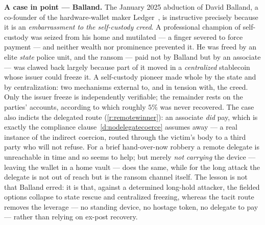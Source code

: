 \medskip\noindent\textbf{A case in point --- Balland.} The January 2025 abduction of
David Balland, a co-founder of the hardware-wallet maker Ledger~\cite{balland}, is
instructive precisely because it is an \emph{embarrassment to the self-custody creed}.
A professional champion of self-custody was seized from his home and mutilated --- a
finger severed to force payment --- and neither wealth nor prominence prevented it. He
was freed by an elite \emph{state} police unit, and the ransom --- paid not by Balland
but by an associate --- was clawed back largely because part of it moved in a
\emph{centralized} stablecoin whose issuer could freeze it. A self-custody pioneer
made whole by the state and by centralization: two mechanisms external to, and in
tension with, the creed. Only the issuer freeze is independently verifiable; the
remainder rests on the parties' accounts, according to which roughly $5\%$ was never recovered.
The case also indicts the delegated route (\ref{r:remotewinner}): an associate
\emph{did} pay, which is exactly the compliance clause~\ref{d:nodelegatecoerce}
assumes away --- a real instance of the indirect coercion,
routed through the victim's body to a third party who will not refuse. For a brief
hand-over-now robbery a remote delegate is unreachable in time and so seems to help;
but merely \emph{not carrying} the device --- leaving the wallet in a home vault ---
does the same, while for the long attack the delegate is not out of reach but is the
ransom channel itself. The lesson is not that Balland erred: it is that, against a
determined long-hold attacker, the fielded options collapse to state rescue and
centralized freezing, whereas the tacit route removes the leverage --- no standing
device, no hostage token, no delegate to pay --- rather than relying on ex-post
recovery.

